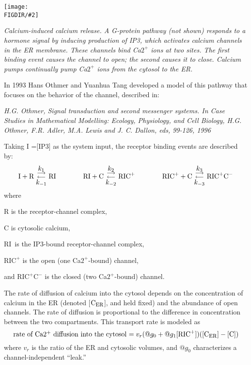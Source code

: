 \documentclass[12pt]{article}
\newcommand{\pic}[2]{\texttt{[image: \\FIGDIR/\#2]}}
\newcommand{\picc}[2]{\centerline{\pic{#1}{#2}}}
\newcommand{\arrowschem}[2]{\raisebox{-2ex}%
	{$\stackrel{\stackrel{\displaystyle#1}{\longrightarrow}}%
	{\stackrel{\longleftarrow}{#2}}$}}
\newcommand{\CER}{\mbox{C}_{\mbox{\sc er}}}
\newcommand{\RICC}{\mbox{RIC}^+\mbox{C}^-}
\newcommand{\RIC}{\mbox{RIC}^+}
\newcommand{\RI}{\mbox{RI}}
\newcommand{\CC}{\mbox{C}}
\begin{document}
\picc{0.3}{fig617_ingalls_calcium.png}

\emph{Calcium-induced calcium release. A G-protein pathway (not shown)
  responds to a hormone signal by inducing production of IP3, which activates
  calcium channels in the ER membrane. These channels bind Ca$2^+$ ions at two
  sites. The first binding event causes the channel to open; the second causes
  it to close. Calcium pumps continually pump Ca$2^+$ ions from the cytosol to
  the ER.}


In 1993 Hans Othmer and Yuanhua Tang developed a model of this pathway that
focuses on the behavior of the channel, described in:

\emph{H.G. Othmer, Signal transduction and second messenger systems. In Case
  Studies in Mathematical Modelling: Ecology, Physiology, and Cell Biology,
  H.G. Othmer, F.R. Adler, M.A. Lewis and J. C. Dallon, eds, 99-126, 1996}

Taking I =[IP3] as the system input, the receptor binding events are described
by:
\[
\mbox{I} + \mbox{R} \;\arrowschem{k_1}{k_{-1}}\; \RI
\quad\quad\quad\quad
\RI + \mbox{C} \;\arrowschem{k_2}{k_{-2}}\; \RIC 
\quad\quad\quad\quad
\RIC + \mbox{C}  \;\arrowschem{k_3}{k_{-3}}\; \RICC
\]
where 

R is the receptor-channel complex, 

C is cytosolic calcium, 

\RI\ is the IP3-bound receptor-channel complex, 

$\RIC$ is the open (one Ca$2^+$-bound) channel, 

and $\RICC$ is the closed (two Ca$2^+$-bound) channel.

The rate of diffusion of calcium into the cytosol depends on the concentration
of calcium in the ER (denoted [$\CER$], and held fixed) and the abundance of open
channels.  The rate of diffusion is proportional to the difference in
concentration between the two compartments. This transport rate is modeled as 
\[
\mbox{rate of Ca$2^+$ diffusion into the cytosol
   $=v_r(@g_0+@g_1[\RIC])([\CER ]- [\CC])$}
\]
where $v_r$ is the ratio of the ER and cytosolic volumes, and $@g_0$
characterizes a channel-independent ``leak.'' 
\end{document}
